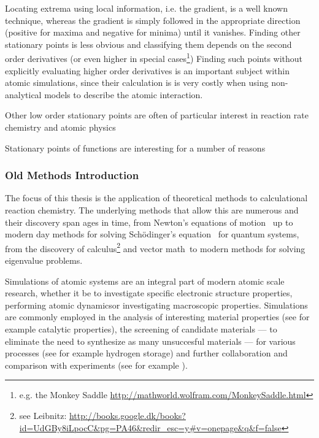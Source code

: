 Locating extrema using local information, i.e. the gradient, is a well known technique\citemiss, whereas the gradient is simply followed in the appropriate direction (positive for maxima and negative for minima) until it vanishes.
Finding other stationary points is less obvious and classifying them depends on the second order derivatives (or even higher in special cases\footnote{e.g. the Monkey Saddle \url{http://mathworld.wolfram.com/MonkeySaddle.html}})
Finding such points without explicitly evaluating higher order derivatives is an important subject within atomic simulations, since their calculation is is very costly when using non-analytical  models to describe the atomic interaction.

Other low order stationary points are often of particular interest in reaction rate chemistry and atomic physics\expand

Stationary points of functions are interesting for a number of reasons \expand

\subsubsection{Old Methods Introduction}
The focus of this thesis is the application of theoretical methods to calculational reaction chemistry.
The underlying methods that allow this are numerous and their discovery span ages in time, from Newton's equations of motion~\cite{newton-latin} up to modern day methods for solving Sch\"odinger's equation~\cite{schrodinger-equation-1926} for quantum systems\cite{hohenberg-kohn-1964, gpaw-review-2010}, from the discovery of calculus\citemiss\footnote{see Leibnitz: \url{http://books.google.dk/books?id=UdGBy8iLpocC&pg=PA46&redir_esc=y\#v=onepage&q&f=false}} and vector math~\citemiss to modern methods for solving eigenvalue problems\citemiss.

Simulations of atomic systems are an integral part of modern atomic scale research, whether it be to investigate specific electronic structure properties\citemiss, performing atomic dynamics\citemiss or investigating macroscopic properties\citemiss.
Simulations are commonly employed in the analysis of interesting material properties (see for example catalytic properties\citemiss), the screening of candidate materials --- to eliminate the need to synthesize as many unsuccesful materials --- for various processes (see for example hydrogen storage\citemiss) and further collaboration and comparison with experiments (see for example \citemiss).

